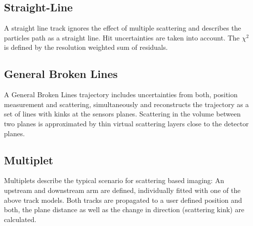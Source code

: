 \subsection*{Straight-Line}
A straight line track ignores the effect of multiple scattering and describes
the particles path as a straight line. Hit uncertainties are taken into account.
The $\chi^2$ is defined by the resolution weighted sum of residuals.
\subsection*{General Broken Lines}
A General Broken Lines trajectory \cite{gbl} includes uncertainties from
both, position measurement and scattering, simultaneously and reconstructs the
trajectory as a set of lines with kinks at the sensors planes. Scattering in
the volume between two planes is approximated by thin virtual scattering
layers close to the detector planes. 

\subsection*{Multiplet}
Multiplets describe the typical scenario for scattering based imaging: An upstream and downstream arm are defined, individually fitted with one of the above track models.
Both tracks are propagated to a user defined position and both, the plane distance as well as the change in direction (scattering kink) are calculated.
